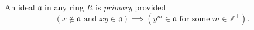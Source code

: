 An ideal $\mathfrak{a}$ in any ring $R$ is \textit{primary} provided
$$(x \notin \mathfrak{a} \text{ and } xy \in \mathfrak{a}) \implies (y^m \in \mathfrak{a} \text{ for some } m \in \mathbb{Z}^+).$$
